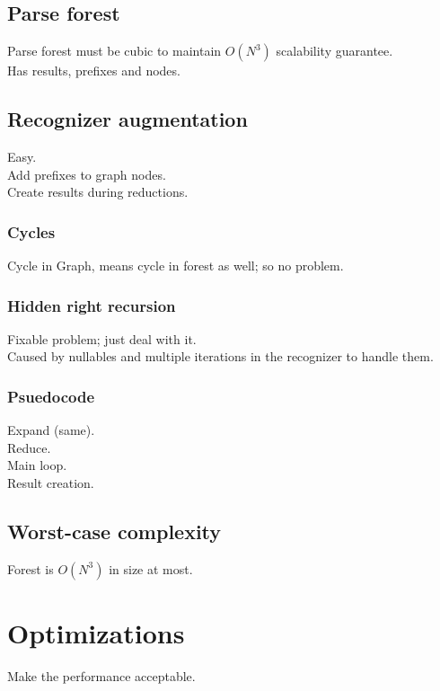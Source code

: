 \documentclass[a4paper,10pt]{article}
\begin{document}
\subsection{Parse forest}

Parse forest must be cubic to maintain $O(N^3)$ scalability guarantee.\\
Has results, prefixes and nodes.

\subsection{Recognizer augmentation}

Easy.\\
Add prefixes to graph nodes.\\
Create results during reductions.

\subsubsection{Cycles}

Cycle in Graph, means cycle in forest as well; so no problem.

\subsubsection{Hidden right recursion}

Fixable problem; just deal with it.\\
Caused by nullables and multiple iterations in the recognizer to handle them.

\subsubsection{Psuedocode}

Expand (same).\\
Reduce.\\
Main loop.\\
Result creation.

\subsection{Worst-case complexity}

Forest is $O(N^3)$ in size at most.

\section{Optimizations}

Make the performance acceptable.
\end{document}
